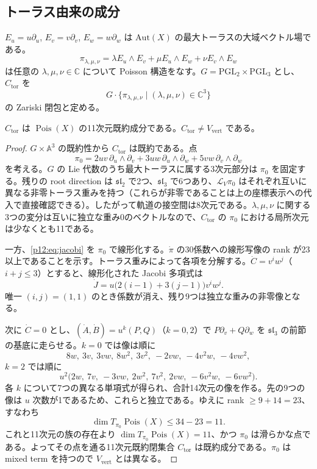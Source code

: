 \subsection{トーラス由来の成分}
$E_u=u\partial_u$, $E_v=v\partial_v$, $E_w=w\partial_w$ は $\mathrm{Aut}(X)$ の最大トーラスの大域ベクトル場である。
\[
 \pi_{\lambda,\mu,\nu}=\lambda E_u\wedge E_v+\mu E_u\wedge E_w+\nu E_v\wedge E_w
\]
は任意の $\lambda,\mu,\nu\in\mathbb C$ について Poisson 構造をなす。$G=\mathrm{PGL}_2\times\mathrm{PGL}_3$ とし、$C_{\mathrm{tor}}$ を
\[
 G\cdot\{\pi_{\lambda,\mu,\nu}\mid(\lambda,\mu,\nu)\in\mathbb C^3\}
\]
の Zariski 閉包と定める。
\begin{theorem}\label{p12:th:toric}
 $C_{\mathrm{tor}}$ は $\operatorname{Pois}(X)$ の11次元既約成分である。$C_{\mathrm{tor}}\ne V_{\mathrm{vert}}$ である。
\end{theorem}
\begin{proof}
 $G\times\mathbb A^3$ の既約性から $C_{\mathrm{tor}}$ は既約である。点
 \[
 \pi_0=2uv\,\partial_u\wedge\partial_v+3uw\,\partial_u\wedge\partial_w+5vw\,\partial_v\wedge\partial_w
 \]
 を考える。$G$ の Lie 代数のうち最大トーラスに属する3次元部分は $\pi_0$ を固定する。残りの root direction は $\mathfrak{sl}_2$ で2つ、$\mathfrak{sl}_3$ で6つあり、$\mathcal L_V\pi_0$ はそれぞれ互いに異なる非零トーラス重みを持つ（これらが非零であることは上の座標表示への代入で直接確認できる）。したがって軌道の接空間は8次元である。$\lambda,\mu,\nu$ に関する3つの変分は互いに独立な重み0のベクトルなので、$C_{\mathrm{tor}}$ の $\pi_0$ における局所次元は少なくとも11である。

 一方、\eqref{p12:eq:jacobi} を $\pi_0$ で線形化する。$\dot\pi$ の30係数への線形写像の rank が23以上であることを示す。トーラス重みによって各項を分解する。$\dot C=v^i w^j$（$i+j\le3$）とすると、線形化された Jacobi 多項式は
 \[
 \dot J=u\bigl(2(i-1)+3(j-1)\bigr)v^i w^j.
 \]
 唯一 $(i,j)=(1,1)$ のとき係数が消え、残り9つは独立な重みの非零像となる。

 次に $\dot C=0$ とし、$(\dot A,\dot B)=u^k(P,Q)$（$k=0,2$）で $P\partial_v+Q\partial_w$ を $\mathfrak{sl}_3$ の前節の基底に走らせる。$k=0$ では像は順に
 \[
 8w,\ 3v,\ 3vw,\ 8w^2,\ 3v^2,\ -2vw,\ -4v^2w,\ -4vw^2,
 \]
 $k=2$ では順に
 \[
 u^2\bigl(2w,\ 7v,\ -3vw,\ 2w^2,\ 7v^2,\ 2vw,\ -6v^2w,\ -6vw^2\bigr).
 \]
 各 $k$ について7つの異なる単項式が得られ、合計14次元の像を作る。先の9つの像は $u$ 次数が1であるため、これらと独立である。ゆえに rank $\ge9+14=23$、すなわち
 \[
 \dim T_{\pi_0}\operatorname{Pois}(X)\le34-23=11.
 \]
 これと11次元の族の存在より $\dim T_{\pi_0}\operatorname{Pois}(X)=11$、かつ $\pi_0$ は滑らかな点である。よってその点を通る11次元既約閉集合 $C_{\mathrm{tor}}$ は既約成分である。$\pi_0$ は mixed term を持つので $V_{\mathrm{vert}}$ とは異なる。
\end{proof}


